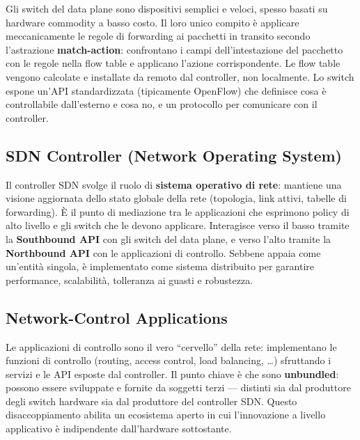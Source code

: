 \documentclass[
  italian,
  openany]{book}
\begin{document}
Gli switch del data plane sono dispositivi semplici e veloci, spesso
basati su hardware commodity a basso costo. Il loro unico compito è
applicare meccanicamente le regole di forwarding ai pacchetti in
transito secondo l'astrazione \textbf{match-action}: confrontano i campi
dell'intestazione del pacchetto con le regole nella flow table e
applicano l'azione corrispondente. Le flow table vengono calcolate e
installate da remoto dal controller, non localmente. Lo switch espone
un'API standardizzata (tipicamente OpenFlow) che definisce cosa è
controllabile dall'esterno e cosa no, e un protocollo per comunicare con
il controller.

\subsection{SDN Controller (Network Operating
System)}\label{sdn-controller-network-operating-system}

Il controller SDN svolge il ruolo di \textbf{sistema operativo di rete}:
mantiene una visione aggiornata dello stato globale della rete
(topologia, link attivi, tabelle di forwarding). È il punto di
mediazione tra le applicazioni che esprimono policy di alto livello e
gli switch che le devono applicare. Interagisce verso il basso tramite
la \textbf{Southbound API} con gli switch del data plane, e verso l'alto
tramite la \textbf{Northbound API} con le applicazioni di controllo.
Sebbene appaia come un'entità singola, è implementato come sistema
distribuito per garantire performance, scalabilità, tolleranza ai guasti
e robustezza.

\subsection{Network-Control
Applications}\label{network-control-applications}

Le applicazioni di controllo sono il vero ``cervello'' della rete:
implementano le funzioni di controllo (routing, access control, load
balancing, \ldots) sfruttando i servizi e le API esposte dal controller.
Il punto chiave è che sono \textbf{unbundled}: possono essere sviluppate
e fornite da soggetti terzi --- distinti sia dal produttore degli switch
hardware sia dal produttore del controller SDN. Questo disaccoppiamento
abilita un ecosistema aperto in cui l'innovazione a livello applicativo
è indipendente dall'hardware sottostante.
\end{document}
